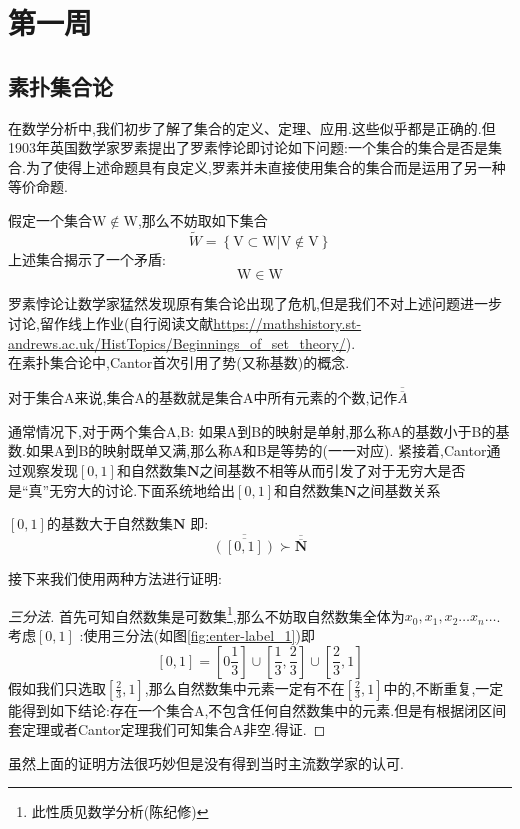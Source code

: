 \section{第一周}
\subsection{素扑集合论}
在数学分析中,我们初步了解了集合的定义、定理、应用.这些似乎都是正确的.但1903年英国数学家罗素提出了罗素悖论即讨论如下问题:一个集合的集合是否是集合.为了使得上述命题具有良定义,罗素并未直接使用集合的集合而是运用了另一种等价命题.
\begin{Example}[罗素悖论]
    假定一个集合\(\mathrm{W}  \notin \mathrm{W}\),那么不妨取如下集合
    \[\widetilde{W} =  \left\{\mathrm{V} \subset \mathrm{W}|  \mathrm{V} \notin \mathrm{V} \right\}\]
    上述集合揭示了一个矛盾: 
                \[\mathrm{W} \in \mathrm{W}\]
\end{Example}
罗素悖论让数学家猛然发现原有集合论出现了危机,但是我们不对上述问题进一步讨论,留作线上作业(自行阅读文献\url{https://mathshistory.st-andrews.ac.uk/HistTopics/Beginnings_of_set_theory/}).
\\
在素扑集合论中,Cantor首次引用了势(又称基数)的概念.
\begin{Definition}
    对于集合A来说,集合A的基数就是集合A中所有元素的个数,记作\(\overline{\overline{A}}\) 
\end{Definition}
通常情况下,对于两个集合A,B: 如果A到B的映射是单射,那么称A的基数小于B的基数.如果A到B的映射既单又满,那么称A和B是等势的(一一对应).
紧接着,Cantor通过观察发现\([0,1]\)和自然数集\(\mathbf{N}\)之间基数不相等从而引发了对于无穷大是否是“真”无穷大的讨论.下面系统地给出\([0,1]\)和自然数集\(\mathbf{N}\)之间基数关系
\begin{Theorem}
\([0,1]\)的基数大于自然数集\(\mathbf{N}\) 即:
   \[ \overline{\overline{([0,1])}} \succ \overline{\overline{\mathbf{N}}}\]
\end{Theorem}
接下来我们使用两种方法进行证明:
\begin{proof}[三分法]
    首先可知自然数集是可数集\footnote{此性质见数学分析(陈纪修)},那么不妨取自然数集全体为\(x_0 , x_1 ,x_2 \dots x_n \dots \).考虑\([0,1]\) :使用三分法(如图\ref{fig:enter-label_1})即\[[0,1] = [0 \frac{1}{3}] \cup [\frac{1}{3}, \frac{2}{3}] \cup [\frac{2}{3}, 1 ] \] 假如我们只选取\([\frac{2}{3} ,1 ] \),那么自然数集中元素一定有不在\([\frac{2}{3}, 1 ]\)中的,不断重复,一定能得到如下结论:存在一个集合A,不包含任何自然数集中的元素.但是有根据闭区间套定理或者Cantor定理我们可知集合A非空.得证.
\end{proof}
虽然上面的证明方法很巧妙但是没有得到当时主流数学家的认可. 
